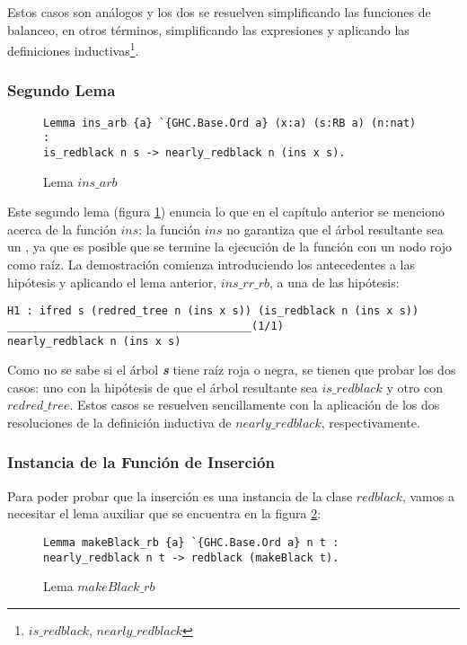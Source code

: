 Estos casos son análogos y los dos se resuelven simplificando las funciones de balanceo, en otros términos,
simplificando las expresiones y aplicando las definiciones inductivas\footnote{$is\_redblack$,
$nearly\_redblack$}.

\subsubsection{Segundo Lema}

\begin{figure}[!ht]
\centering
\captionsetup{justification=centering}
\begin{verbatim}
Lemma ins_arb {a} `{GHC.Base.Ord a} (x:a) (s:RB a) (n:nat) :
is_redblack n s -> nearly_redblack n (ins x s).
\end{verbatim}
\caption{Lema $ins\_arb$}
\label{lema_2}
\end{figure}

Este segundo lema (figura \ref{lema_2}) enuncia lo que en el cap\'itulo anterior se menciono acerca
de la funci\'on $ins$: la funci\'on $ins$ no garantiza que el \'arbol resultante sea un {\arn}, ya
que es posible que se termine la ejecuci\'on de la funci\'on con un nodo rojo como raíz. La
demostraci\'on comienza introduciendo los antecedentes a las hipótesis y aplicando el lema
anterior, $ins\_rr\_rb$, a una de las hip\'otesis:

\begin{verbatim}
H1 : ifred s (redred_tree n (ins x s)) (is_redblack n (ins x s))
______________________________________(1/1)
nearly_redblack n (ins x s)

\end{verbatim}

Como no se sabe si el \'arbol \textit{\textbf{s}} tiene ra\'iz roja o negra, se tienen que probar los dos casos:
uno con la hipótesis de que el \'arbol resultante sea $is\_redblack$ y otro con $redred\_tree$.
Estos casos se resuelven sencillamente con la aplicación de los dos resoluciones de la definici\'on
inductiva de $nearly\_redblack$, respectivamente.

\subsubsection{Instancia de la Funci\'on de Inserci\'on}

Para poder probar que la inserci\'on es una instancia de la clase $redblack$, vamos a necesitar el
lema auxiliar que se encuentra en la figura \ref{lema_3}:
\begin{figure}[!ht]
\centering
\captionsetup{justification=centering}
\begin{verbatim}
Lemma makeBlack_rb {a} `{GHC.Base.Ord a} n t :
nearly_redblack n t -> redblack (makeBlack t).
\end{verbatim}
\caption{Lema $makeBlack\_rb$}
\label{lema_3}
\end{figure}

